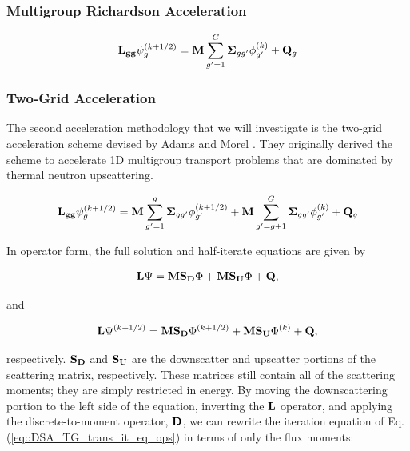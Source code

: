 \subsubsection{Multigroup Richardson Acceleration}
\label{sec:DSA_DSA_MG_WGS}

\begin{equation}
\label{eq::DSA_WG_trans_it_eq}
{\bf L_{gg}} \psi_g^{(k+1/2)} =  {\bf M} \sum_{g'=1}^G {\bf \Sigma}_{g g'} \phi_{g'}^{(k)} + {\bf Q}_g
\end{equation}



\subsubsection{Two-Grid Acceleration}
\label{sec:DSA_DSA_MG_TG}

The second acceleration methodology that we will investigate is the two-grid acceleration scheme devised by Adams and Morel \cite{adams1993two}. They originally derived the scheme to accelerate 1D multigroup transport problems that are dominated by thermal neutron upscattering. 

\begin{equation}
\label{eq::DSA_TG_trans_it_eq}
{\bf L_{gg}} \psi_g^{(k+1/2)} = {\bf M} \sum_{g'=1}^g {\bf \Sigma}_{g g'} \phi_{g'}^{(k+1/2)} + {\bf M} \sum_{g'=g+1}^G {\bf \Sigma}_{g g'} \phi_{g'}^{(k)} + {\bf Q}_g
\end{equation}

\noindent In operator form, the full solution and half-iterate equations are given by

\begin{equation}
\label{eq::DSA_TG_trans_eq_ops}
{\bf L} \Psi = {\bf M} {\bf S_D} \Phi + {\bf M} {\bf S_U} \Phi + {\bf Q} ,
\end{equation}

\noindent and

\begin{equation}
\label{eq::DSA_TG_trans_it_eq_ops}
{\bf L} \Psi^{(k+1/2)} = {\bf M} {\bf S_D} \Phi^{(k+1/2)} + {\bf M} {\bf S_U} \Phi^{(k)} + {\bf Q} ,
\end{equation}

\noindent respectively. ${\bf S_D}$ and ${\bf S_U}$ are the downscatter and upscatter portions of the scattering matrix, respectively. These matrices still contain all of the scattering moments; they are simply restricted in energy. By moving the downscattering portion to the left side of the equation, inverting the ${\bf L}$ operator, and applying the discrete-to-moment operator, ${\bf D}$, we can rewrite the iteration equation of Eq. (\ref{eq::DSA_TG_trans_it_eq_ops}) in terms of only the flux moments:

